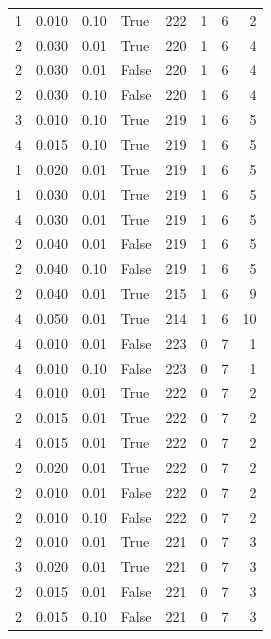 \documentclass[a4paper,twoside,12pt]{book}
\begin{document}
\begin{table}
\begin{tabular}{rrrlrrrr}
				1 &  0.010 &     0.10 &     True &  222 &  1 &   6 &   2 \\
				2 &  0.030 &     0.01 &     True &  220 &  1 &   6 &   4 \\
				2 &  0.030 &     0.01 &    False &  220 &  1 &   6 &   4 \\
				2 &  0.030 &     0.10 &    False &  220 &  1 &   6 &   4 \\
				3 &  0.010 &     0.10 &     True &  219 &  1 &   6 &   5 \\
				4 &  0.015 &     0.10 &     True &  219 &  1 &   6 &   5 \\
				1 &  0.020 &     0.01 &     True &  219 &  1 &   6 &   5 \\
				1 &  0.030 &     0.01 &     True &  219 &  1 &   6 &   5 \\
				4 &  0.030 &     0.01 &     True &  219 &  1 &   6 &   5 \\
				2 &  0.040 &     0.01 &    False &  219 &  1 &   6 &   5 \\
				2 &  0.040 &     0.10 &    False &  219 &  1 &   6 &   5 \\
				2 &  0.040 &     0.01 &     True &  215 &  1 &   6 &   9 \\
				4 &  0.050 &     0.01 &     True &  214 &  1 &   6 &  10 \\
				4 &  0.010 &     0.01 &    False &  223 &  0 &   7 &   1 \\
				4 &  0.010 &     0.10 &    False &  223 &  0 &   7 &   1 \\
				4 &  0.010 &     0.01 &     True &  222 &  0 &   7 &   2 \\
				2 &  0.015 &     0.01 &     True &  222 &  0 &   7 &   2 \\
				4 &  0.015 &     0.01 &     True &  222 &  0 &   7 &   2 \\
				2 &  0.020 &     0.01 &     True &  222 &  0 &   7 &   2 \\
				2 &  0.010 &     0.01 &    False &  222 &  0 &   7 &   2 \\
				2 &  0.010 &     0.10 &    False &  222 &  0 &   7 &   2 \\
				2 &  0.010 &     0.01 &     True &  221 &  0 &   7 &   3 \\
				3 &  0.020 &     0.01 &     True &  221 &  0 &   7 &   3 \\
				2 &  0.015 &     0.01 &    False &  221 &  0 &   7 &   3 \\
				2 &  0.015 &     0.10 &    False &  221 &  0 &   7 &   3 \\

\end{tabular}
\end{table}
\end{document}
